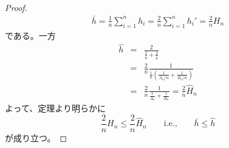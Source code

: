 \documentclass[12pt]{jsarticle}
\def\arithmean#1{\bar{#1}}
\def\arithsum#1{#1}
\def\harmmean#1{\hat{#1}}
\def\harmformula#1#2#3{\frac{#1}{\frac{1}{#2} + \frac{1}{#3}}}
\begin{document}
\begin{proof}
\begin{eqnarray}
\arithmean{h} =
\frac{1}{n} \sum_{i=1}^{n} h_i
= \frac{2}{n} \sum_{i=1}^{n} {h_i}'
= \frac{2}{n} \arithsum{H}_{n}
\end{eqnarray}
である。一方
\begin{eqnarray}
\harmmean{h} &=&
\harmformula{2}{\arithmean{a}}{\arithmean{b}} \\
&=& \frac{2}{n} \frac{1}{\frac{1}{n} \left(
\frac{1}{A_n / n} + \frac{1}{B_n / n} \right) } \\
&=& \frac{2}{n} \harmformula{1}{A_n}{B_n} = \frac{2}{n} \harmmean{H}_{n}
\end{eqnarray}
よって、定理より明らかに
\begin{equation}
\frac{2}{n} \arithsum{H}_{n} \le \frac{2}{n} \harmmean{H}_{n}
\qquad \text{i.e.,} \qquad
\arithmean{h} \le \harmmean{h}
\end{equation}
が成り立つ。
\end{proof}
\end{document}
